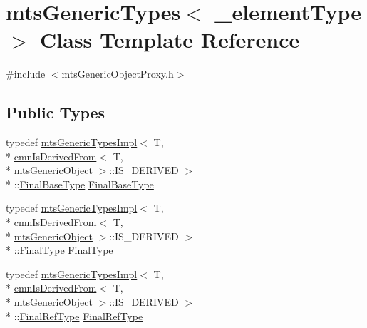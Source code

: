 \hypertarget{classmts_generic_types}{\section{mts\-Generic\-Types$<$ \-\_\-element\-Type $>$ Class Template Reference}
\label{classmts_generic_types}
}


{\ttfamily \#include $<$mts\-Generic\-Object\-Proxy.\-h$>$}

\subsection*{Public Types}
\begin{DoxyCompactItemize}
\item 
typedef \hyperlink{classmts_generic_types_impl}{mts\-Generic\-Types\-Impl}$<$ T, \\*
\hyperlink{classcmn_is_derived_from}{cmn\-Is\-Derived\-From}$<$ T, \\*
\hyperlink{classmts_generic_object}{mts\-Generic\-Object} $>$\-::I\-S\-\_\-\-D\-E\-R\-I\-V\-E\-D $>$\\*
\-::\hyperlink{classmts_generic_types_a8b501ef19a4e81069482410611ef4baf}{Final\-Base\-Type} \hyperlink{classmts_generic_types_a8b501ef19a4e81069482410611ef4baf}{Final\-Base\-Type}
\item 
typedef \hyperlink{classmts_generic_types_impl}{mts\-Generic\-Types\-Impl}$<$ T, \\*
\hyperlink{classcmn_is_derived_from}{cmn\-Is\-Derived\-From}$<$ T, \\*
\hyperlink{classmts_generic_object}{mts\-Generic\-Object} $>$\-::I\-S\-\_\-\-D\-E\-R\-I\-V\-E\-D $>$\\*
\-::\hyperlink{classmts_generic_types_a30f6796ebe31d20eda0ee4e874238276}{Final\-Type} \hyperlink{classmts_generic_types_a30f6796ebe31d20eda0ee4e874238276}{Final\-Type}
\item 
typedef \hyperlink{classmts_generic_types_impl}{mts\-Generic\-Types\-Impl}$<$ T, \\*
\hyperlink{classcmn_is_derived_from}{cmn\-Is\-Derived\-From}$<$ T, \\*
\hyperlink{classmts_generic_object}{mts\-Generic\-Object} $>$\-::I\-S\-\_\-\-D\-E\-R\-I\-V\-E\-D $>$\\*
\-::\hyperlink{classmts_generic_types_a7c2afd28b04e256ba9e64661009c078e}{Final\-Ref\-Type} \hyperlink{classmts_generic_types_a7c2afd28b04e256ba9e64661009c078e}{Final\-Ref\-Type}
\end{DoxyCompactItemize}
